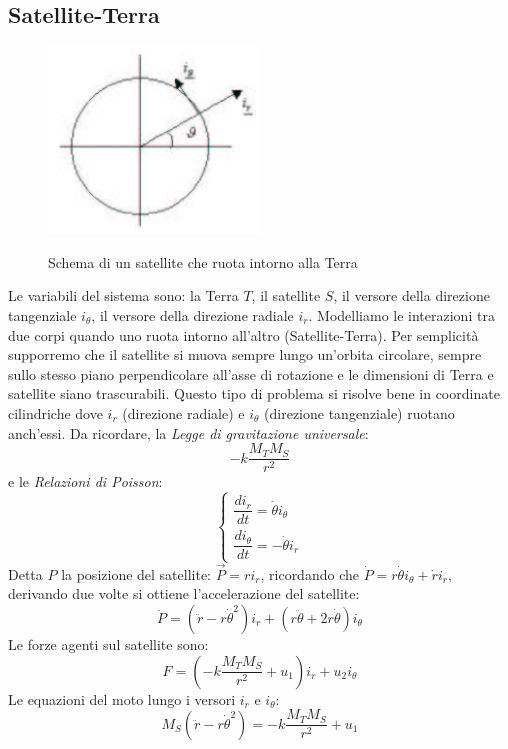 \documentclass[a4paper]{report}
\begin{document}
\subsection{Satellite-Terra}
\begin{figure}[!b]
  \centering
  \includegraphics[width=0.5\textwidth]{./images/terrasatellite.png}
  \label{fig:terrasatellite}
  \caption{Schema di un satellite che ruota intorno alla Terra\label{fig:terrasatellite}}
\end{figure}
Le variabili del sistema sono: la Terra $T$, il satellite $S$,
il versore della direzione tangenziale $i_{\theta}$, il versore
della direzione radiale $i_r$. Modelliamo le interazioni tra due corpi
quando uno ruota intorno all'altro (Satellite-Terra). Per semplicit\`a
supporremo che il satellite si muova sempre lungo un'orbita circolare,
sempre sullo stesso piano perpendicolare all'asse di rotazione e le
dimensioni di Terra e satellite siano trascurabili. Questo tipo di
problema si risolve bene in coordinate cilindriche dove $i_r$
(direzione radiale) e $i_{\theta}$ (direzione tangenziale) ruotano
anch'essi. Da ricordare, la {\em Legge di gravitazione
  universale}:
$$-k \frac{M_T M_S}{r^2}$$
e le {\em Relazioni di Poisson}:
\[
  \left\{
  \begin{array}{l}
    \dfrac{di_r}{dt} = \dot{\theta}i_{\theta}\\
    \dfrac{di_{\theta}}{dt} = - \dot{\theta} i_r
  \end{array}\right .
\]
Detta $P$ la posizione del satellite: $\vec{P} = r i_r$, ricordando
che $\dot{P} = r \dot{\theta} i_{\theta} + \dot{r}i_r$, derivando due
volte si ottiene l'accelerazione del satellite:
$$\ddot{P} = (\ddot{r} - r \dot{\theta}^2)i_r + (r \ddot{\theta} + 2r \dot{\theta})i_{\theta}$$
Le forze agenti sul satellite sono:
$$F = \left( -k \dfrac{M_T M_S}{r^2} + u_1 \right)i_r + u_2
i_{\theta}$$
Le equazioni del moto lungo i versori $i_r$ e $i_{\theta}$:
\[
  M_S (\ddot{r} - r \dot{\theta}^2) = -k \dfrac{M_T M_S}{r^2} + u_1
\]
\end{document}
